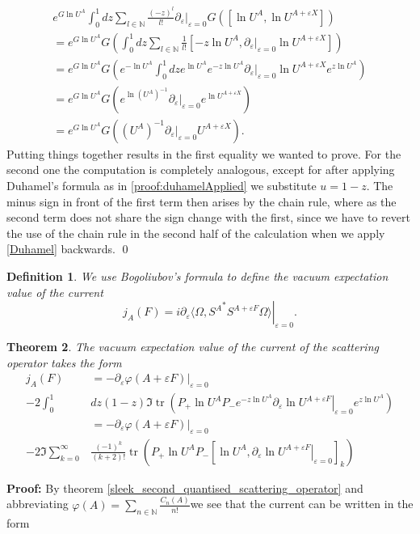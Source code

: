 \documentclass[b5paper,draft,openbib,12pt]{memoir}
\newtheorem{Def}{Definition}[section]
\newtheorem{Thm}[Def]{Theorem}
\DeclareMathOperator{\tr}{tr}
\begin{document}
\begin{multline}
e^{G \ln U^A} \int_0^1 d z \sum_{l\in\mathbb{N}} \frac{(-z)^l}{l!} \partial_\varepsilon |_{\varepsilon=0} G\left(\left[ \ln U^A, \ln U^{A+\varepsilon X}\right]\right) \\
=e^{G \ln U^A}  G\left( \int_0^1 d z \sum_{l\in\mathbb{N}} \frac{1}{l!}  \left[ -z \ln U^A,\partial_\varepsilon|_{\varepsilon=0} \ln U^{A+\varepsilon X}\right]\right) \\
=e^{G \ln U^A}  G\left(e^{- \ln U^A} \int_0^1 d z e^{ \ln U^A} e^{-z \ln U^A}\partial_\varepsilon|_{\varepsilon=0} \ln U^{A+\varepsilon X} e^{z \ln U^A}\right) \\
=e^{G \ln U^A}  G\left(e^{ \ln \left(U^A\right)^{-1}} \partial_\varepsilon|_{\varepsilon=0} e^{ \ln U^{A+\varepsilon X}} \right) \\
=e^{G \ln U^A}  G\left(\left(U^A\right)^{-1} \partial_\varepsilon|_{\varepsilon=0}U^{A+\varepsilon X} \right).
\end{multline}
Putting things together results in the first equality we wanted to prove. For the second one the computation is completely analogous, except for after applying Duhamel's formula as in \eqref{proof:duhamelApplied} we substitute \(u=1-z\). The minus sign in front of the first term then arises by the chain rule, where as the second term does not share the sign change with the first, since we have to revert the use of the chain rule in the second half of the calculation when we apply  \eqref{Duhamel} backwards. \qed

\begin{Def}
We use Bogoliubov's formula to define the vacuum expectation value of the current 
\begin{equation}
j_A(F) = i \partial_{\varepsilon}\left. \langle \Omega, {S^{A} }^* S^{A+\varepsilon F}\Omega \rangle \right|_{\varepsilon=0}.
\end{equation}
\end{Def}



\begin{Thm}\label{thm:CurrentExact}
The vacuum expectation value of the current of the scattering operator takes the form
\begin{align*}
j_A(F)&=- \partial_{\varepsilon} \left. \varphi(A+\varepsilon F) \right|_{\varepsilon=0}\\
-2\int_0^1 &d z (1-z)  \Im \tr\left(P_+ \ln U^A P_- e^{ -z \ln U^A} \partial_{\varepsilon} \left. \ln U^{A+\varepsilon F}\right|_{\varepsilon=0} e^{ z \ln U^A}\right)\\
&=- \partial_{\varepsilon} \left.\varphi(A+\varepsilon F) \right|_{\varepsilon=0}\\
  - 2\Im \sum_{k=0}^\infty&\frac{(-1)^k}{(k+2)!}  \tr \left( P_+ \ln U^A P_-\left[\ln U^A,\left.\partial_{\varepsilon}\ln U^{A+\varepsilon F} \right|_{\varepsilon=0}\right]_{k}\right) 
\end{align*}
\end{Thm}
\textbf{Proof:} By theorem \ref{sleek_second_quantised_scattering_operator} and abbreviating
\(\varphi(A)= \sum_{n\in\mathbb{N}} \frac{C_n(A)}{n!} \)we see that the current can be written in the form
\end{document}
